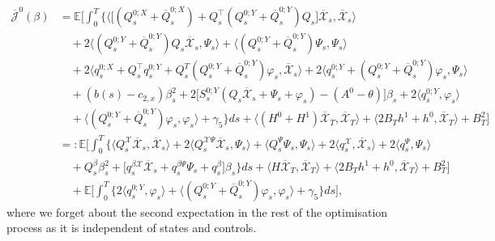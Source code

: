 \documentclass[11pt,twoside]{amsart}
\theoremstyle{definition}
\numberwithin{equation}{section}
\renewcommand{\bar}{\overline}
\begin{document}
\begin{align}
    \bar{\mathcal{J}}^0(\beta)  
    & = \mathbb{E}\Bigg[ \int_0^T \bigg\{
    \bigg\langle  \big[(Q^{0;X}_s + \bar{Q}^{0;X}_s) + Q_s^\top (Q^{0;Y}_s + \bar{Q}^{0;Y}_s)Q_s\big]\bar{\mathcal{X}}_s, \bar{\mathcal{X}}_s \bigg\rangle \\
    & \nonumber \quad + 2\bigg\langle  (Q^{0;Y}_s + \bar{Q}^{0;Y}_s)Q_s\bar{\mathcal{X}}_s , \Psi_s\bigg\rangle+ \langle  (Q^{0;Y}_s + \bar{Q}^{0;Y}_s) \Psi_s ,\Psi_s \rangle \\
    & \nonumber \quad +2\langle  q^{0;X}_s +Q_s^\top q^{0;Y}_s+Q_s^T(Q^{0;Y}_s + \bar{Q}^{0;Y}_s) \varphi_s, \bar{\mathcal{X}}_s\rangle + 2\langle  q^{0;Y}_s +(Q^{0;Y}_s + \bar{Q}^{0;Y}_s) \varphi_s , \Psi_s\rangle \\
    & \nonumber \quad + (b(s) - c_{2,x} )\beta^2_s + 2\bigg[ S^{0;Y}_s (Q_s \bar{\mathcal{X}}_s + \Psi_s + \varphi_s)-(A^0-\theta)\bigg] \beta_s+ 2\langle  q^{0;Y}_s,\varphi_s \rangle  \\
    &\nonumber \quad + \langle  (Q^{0;Y}_s + \bar{Q}^{0;Y}_s) \varphi_s ,\varphi_s \rangle + \gamma_5 \bigg\}ds  + {\langle } (H^0 +H^1)\bar{\mathcal{X}}_T , \bar{\mathcal{X}}_T\rangle + \langle  2B_Th^1 + h^0, \bar{\mathcal{X}}_T\rangle + B^2_T\Bigg]\\
    & \nonumber =: \mathbb{E}\Bigg[ \int_0^T \bigg\{
    \bigg\langle  Q^{\mathcal{X}}_s\bar{\mathcal{X}}_s, \bar{\mathcal{X}}_s \bigg\rangle  + 2\bigg\langle  Q^{\mathcal{X }\Psi}_s\bar{\mathcal{X}}_s , \Psi_s\bigg\rangle+ \langle  Q^{\Psi}_s \Psi_s ,\Psi_s \rangle +2\langle  q^{\mathcal X}_s, \bar{\mathcal{X}}_s\rangle + 2\langle  q^{\Psi}_s, \Psi_s\rangle \\
    & \nonumber \quad + Q^\beta_s \beta^2_s + \bigg[ q^{\beta \mathcal{X}}_s \bar{\mathcal{X}}_s + q^{\beta \Psi}_s\Psi_s + q^{\beta}_s \bigg] \beta_s \bigg\}ds + {\langle } H \bar{\mathcal{X}}_T , \bar{\mathcal{X}}_T\rangle + \langle  2B_Th^1 + h^0, \bar{\mathcal{X}}_T\rangle + B^2_T\Bigg]  
    \\
    &\nonumber \quad  + \mathbb{E}\Bigg[ \int_0^T \bigg\{
    2\langle  q^{0;Y}_s,\varphi_s \rangle + \langle  (Q^{0;Y}_s + \bar{Q}^{0;Y}_s) \varphi_s ,\varphi_s \rangle + \gamma_5 \bigg\}ds \Bigg],
\end{align}
where we forget about the second expectation in the rest of the optimisation process as it is independent of states and controls.
\end{document}
